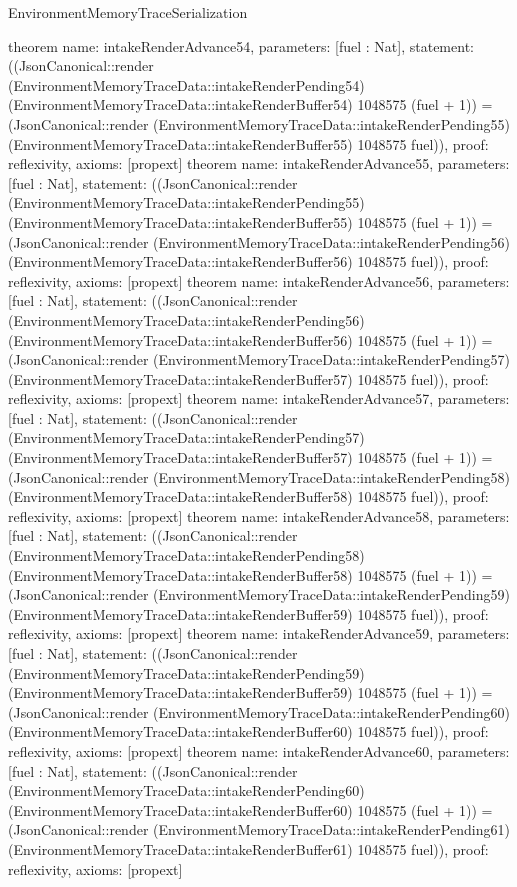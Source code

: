 \begin{lexlean}{EnvironmentMemoryTraceSerialization}
\begin{semanticmodule}
{}
theorem{
 name: intakeRenderAdvance54, parameters: [fuel : Nat],
 statement: ((JsonCanonical::render (EnvironmentMemoryTraceData::intakeRenderPending54) (EnvironmentMemoryTraceData::intakeRenderBuffer54) 1048575 (fuel + 1)) = (JsonCanonical::render (EnvironmentMemoryTraceData::intakeRenderPending55) (EnvironmentMemoryTraceData::intakeRenderBuffer55) 1048575 fuel)), proof: reflexivity{}, axioms: [propext]
}
theorem{
 name: intakeRenderAdvance55, parameters: [fuel : Nat],
 statement: ((JsonCanonical::render (EnvironmentMemoryTraceData::intakeRenderPending55) (EnvironmentMemoryTraceData::intakeRenderBuffer55) 1048575 (fuel + 1)) = (JsonCanonical::render (EnvironmentMemoryTraceData::intakeRenderPending56) (EnvironmentMemoryTraceData::intakeRenderBuffer56) 1048575 fuel)), proof: reflexivity{}, axioms: [propext]
}
theorem{
 name: intakeRenderAdvance56, parameters: [fuel : Nat],
 statement: ((JsonCanonical::render (EnvironmentMemoryTraceData::intakeRenderPending56) (EnvironmentMemoryTraceData::intakeRenderBuffer56) 1048575 (fuel + 1)) = (JsonCanonical::render (EnvironmentMemoryTraceData::intakeRenderPending57) (EnvironmentMemoryTraceData::intakeRenderBuffer57) 1048575 fuel)), proof: reflexivity{}, axioms: [propext]
}
theorem{
 name: intakeRenderAdvance57, parameters: [fuel : Nat],
 statement: ((JsonCanonical::render (EnvironmentMemoryTraceData::intakeRenderPending57) (EnvironmentMemoryTraceData::intakeRenderBuffer57) 1048575 (fuel + 1)) = (JsonCanonical::render (EnvironmentMemoryTraceData::intakeRenderPending58) (EnvironmentMemoryTraceData::intakeRenderBuffer58) 1048575 fuel)), proof: reflexivity{}, axioms: [propext]
}
theorem{
 name: intakeRenderAdvance58, parameters: [fuel : Nat],
 statement: ((JsonCanonical::render (EnvironmentMemoryTraceData::intakeRenderPending58) (EnvironmentMemoryTraceData::intakeRenderBuffer58) 1048575 (fuel + 1)) = (JsonCanonical::render (EnvironmentMemoryTraceData::intakeRenderPending59) (EnvironmentMemoryTraceData::intakeRenderBuffer59) 1048575 fuel)), proof: reflexivity{}, axioms: [propext]
}
theorem{
 name: intakeRenderAdvance59, parameters: [fuel : Nat],
 statement: ((JsonCanonical::render (EnvironmentMemoryTraceData::intakeRenderPending59) (EnvironmentMemoryTraceData::intakeRenderBuffer59) 1048575 (fuel + 1)) = (JsonCanonical::render (EnvironmentMemoryTraceData::intakeRenderPending60) (EnvironmentMemoryTraceData::intakeRenderBuffer60) 1048575 fuel)), proof: reflexivity{}, axioms: [propext]
}
theorem{
 name: intakeRenderAdvance60, parameters: [fuel : Nat],
 statement: ((JsonCanonical::render (EnvironmentMemoryTraceData::intakeRenderPending60) (EnvironmentMemoryTraceData::intakeRenderBuffer60) 1048575 (fuel + 1)) = (JsonCanonical::render (EnvironmentMemoryTraceData::intakeRenderPending61) (EnvironmentMemoryTraceData::intakeRenderBuffer61) 1048575 fuel)), proof: reflexivity{}, axioms: [propext]
}
\end{semanticmodule}
\end{lexlean}
